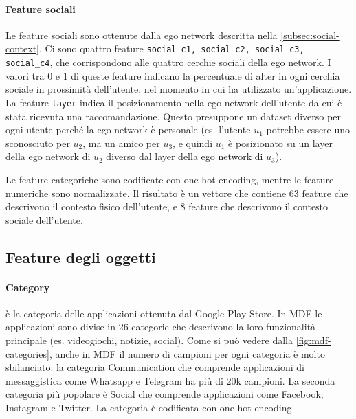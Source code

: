 \documentclass[12pt,italian]{report}
\begin{document}
\paragraph{Feature sociali} Le feature sociali sono ottenute dalla ego network descritta nella \autoref{subsec:social-context}. Ci sono quattro feature \texttt{social\_c1, social\_c2, social\_c3, social\_c4}, che corrispondono alle quattro cerchie sociali della ego network. I valori tra 0 e 1 di queste feature indicano la percentuale di alter in ogni cerchia sociale in prossimità dell'utente, nel momento in cui ha utilizzato un'applicazione. La feature \texttt{layer} indica il posizionamento nella ego network dell'utente da cui è stata ricevuta una raccomandazione. Questo presuppone un dataset diverso per ogni utente perché la ego network è personale (es. l'utente $u_1$ potrebbe essere uno sconosciuto per $u_2$, ma un amico per $u_3$, e quindi $u_1$ è posizionato su un layer della ego network di $u_2$ diverso dal layer della ego network di $u_3$).

\bigskip \noindent
Le feature categoriche sono codificate con one-hot encoding, mentre le feature numeriche sono normalizzate. Il risultato è un vettore che contiene 63 feature che descrivono il contesto fisico dell'utente, e 8 feature che descrivono il contesto sociale dell'utente.

\subsection{Feature degli oggetti}

\paragraph{Category}
è la categoria delle applicazioni ottenuta dal Google Play Store. In
MDF le applicazioni sono divise in 26 categorie che descrivono la loro funzionalità principale (es. videogiochi, notizie, social). Come si può vedere dalla \autoref{fig:mdf-categories}, anche in MDF il numero di campioni per ogni categoria è molto sbilanciato: la categoria Communication che comprende applicazioni di messaggistica come Whatsapp e Telegram ha più di
20k campioni. La seconda categoria più popolare è Social che comprende applicazioni come Facebook, Instagram e Twitter. La categoria è codificata con one-hot encoding.
\end{document}
